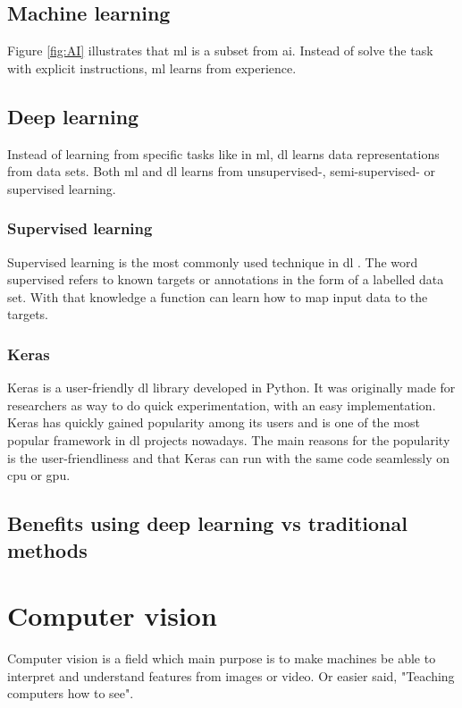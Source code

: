 \documentclass[USenglish]{ifimaster}  %
\begin{document}
\subsection{Machine learning}
Figure \ref{fig:AI} illustrates that \ac{ml} is a subset from \ac{ai}. Instead of solve the task with explicit instructions, \ac{ml} learns from experience.
\subsection{Deep learning}
Instead of learning from specific tasks like in \ac{ml}, \ac{dl} learns data representations from data sets. Both \ac{ml} and \ac{dl} learns from unsupervised-, semi-supervised- or supervised learning. 
\subsubsection{Supervised learning}
Supervised learning is the most commonly used technique in \ac{dl} \cite{Francois_Deep_learning_with_python}. The word supervised refers to known targets or annotations in the form of a labelled data set. With that knowledge a function can learn how to map input data to the targets. 
\subsubsection{Keras}
Keras is a user-friendly \ac{dl} library developed in Python. It was originally made for researchers as way to do quick experimentation, with an easy implementation. Keras has quickly gained popularity among its users and is one of the most popular framework in \ac{dl} projects nowadays. The main reasons for the popularity is the user-friendliness and that Keras can run with the same code seamlessly on \ac{cpu} or \ac{gpu}\cite{Francois_Deep_learning_with_python}.
\subsection{Benefits using deep learning vs traditional methods}
\section{Computer vision}
Computer vision is a field which main purpose is to make machines be able to interpret and understand features from images or video. Or easier said, "Teaching computers
how to see"\cite{website:maskinsyn-intro}.  
\end{document}
